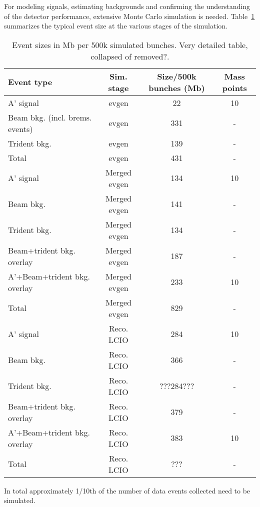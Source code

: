 For modeling signals, estimating backgrounds and confirming the understanding of the detector 
performance, extensive Monte Carlo simulation is needed. Table~\ref{tab:mc_event_size} summarizes 
the typical event size at the various stages of the simulation. 
\begin{table}[]
\centering
\begin{tabular}{|lccc|}
\hline
Event type & Sim. stage & Size/500k bunches (Mb) & Mass points  \\
\hline 
A' signal & evgen & 22 & 10  \\
Beam bkg. (incl. brems. events) & evgen & 331 & -\\ 
Trident bkg. & evgen & 139 & - \\
\hline
Total & evgen & 431 & -\\
\hline
A' signal & Merged evgen & 134 & 10 \\
Beam bkg. & Merged evgen & 141 & - \\ 
Trident bkg. & Merged evgen & 134 & - \\
Beam+trident bkg. overlay & Merged evgen & 187 & - \\ 
A'+Beam+trident bkg. overlay & Merged evgen & 233 & 10 \\ 
\hline
Total & Merged evgen & 829 & - \\
\hline
A' signal & Reco. LCIO  & 284 & 10 \\
Beam bkg. & Reco. LCIO  & 366 & - \\ 
Trident bkg. & Reco. LCIO  & ???284??? & - \\
Beam+trident bkg. overlay & Reco. LCIO  & 379 & - \\ 
A'+Beam+trident bkg. overlay & Reco. LCIO  & 383 & 10 \\ 
\hline
Total & Reco. LCIO  & ??? & - \\
\hline
\end{tabular}
\caption{{\small Event sizes in Mb per 500k simulated bunches. {\color{red} Very detailed table, collapsed of removed?.}}}
\label{tab:mc_event_size}
\end{table}
%
%
In total approximately 1/10th of the number of data events collected need to be simulated. 

